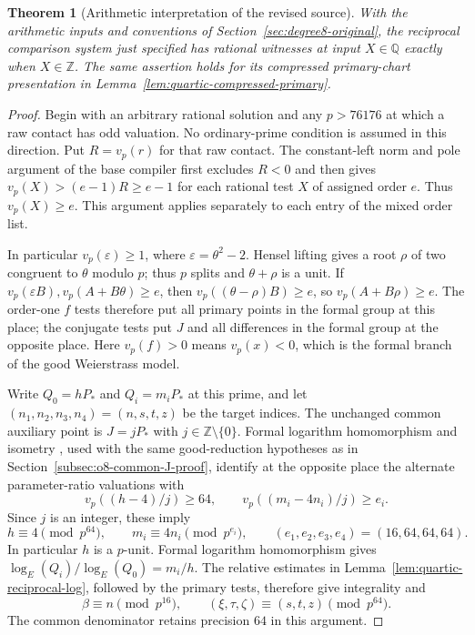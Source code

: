 \documentclass[11pt]{article}
\newtheorem{theorem}{Theorem}[section]
\theoremstyle{definition}
\theoremstyle{remark}
\newcommand{\Q}{\mathbb Q}
\newcommand{\Z}{\mathbb Z}
\begin{document}
\begin{theorem}[Arithmetic interpretation of the revised source]
\label{thm:quartic-source-arithmetic}
With the arithmetic inputs and conventions of
Section~\ref{sec:degree8-original}, the reciprocal comparison system just
specified has rational witnesses at input $X\in\Q$ exactly when $X\in\Z$.
The same assertion holds for its compressed primary-chart presentation
in Lemma~\ref{lem:quartic-compressed-primary}.
\end{theorem}
\begin{proof}
Begin with an arbitrary rational solution and any $p>76176$ at which
a raw contact has odd valuation. No ordinary-prime condition is assumed
in this direction. Put $R=v_p(r)$ for that raw contact. The constant-left
norm and pole argument of the base compiler first excludes $R<0$ and then
gives $v_p(X)> (e-1)R\ge e-1$ for each rational test $X$ of assigned
order $e$. Thus $v_p(X)\ge e$. This argument applies separately to each
entry of the mixed order list.

In particular $v_p(\varepsilon)\ge1$, where $\varepsilon=\theta^2-2$.
Hensel lifting gives a root $\rho$ of two congruent to $\theta$ modulo $p$;
thus $p$ splits and $\theta+\rho$ is a unit. If
$v_p(\varepsilon B),v_p(A+B\theta)\ge e$, then
$v_p((\theta-\rho)B)\ge e$, so $v_p(A+B\rho)\ge e$.
The order-one $f$ tests therefore put all primary points in the formal
group at this place; the conjugate tests put $J$ and all differences in
the formal group at the opposite place. Here $v_p(f)>0$ means
$v_p(x)<0$, which is the formal branch of the good Weierstrass model.

Write $Q_0=hP_*$ and $Q_i=m_iP_*$ at this prime, and let
$(n_1,n_2,n_3,n_4)=(n,s,t,z)$ be the target indices. The unchanged
common auxiliary point is $J=jP_*$ with $j\in\Z\setminus\{0\}$.
Formal logarithm homomorphism and isometry
\cite[IV.6.4 and VII.2.1--2.2]{silverman}, used with the same good-reduction
hypotheses as in Section~\ref{subsec:o8-common-J-proof}, identify
at the opposite place
the alternate parameter-ratio valuations with
\[
 v_p((h-4)/j)\ge64,\qquad
 v_p((m_i-4n_i)/j)\ge e_i.
\]
Since $j$ is an integer, these imply
\[
 h\equiv4\pmod {p^{64}},\qquad m_i\equiv4n_i\pmod {p^{e_i}},
 \qquad(e_1,e_2,e_3,e_4)=(16,64,64,64).
\]
In particular $h$ is a $p$-unit. Formal logarithm homomorphism gives
$\log_E(Q_i)/\log_E(Q_0)=m_i/h$. The relative estimates in
Lemma~\ref{lem:quartic-reciprocal-log}, followed by the primary tests,
therefore give integrality and
\begin{equation}\label{eq:quartic-mixed-congruences}
 \beta\equiv n\pmod {p^{16}},\qquad
 (\xi,\tau,\zeta)\equiv(s,t,z)\pmod {p^{64}}.
\end{equation}
The common denominator retains precision $64$ in this argument.


\end{proof}
\end{document}
